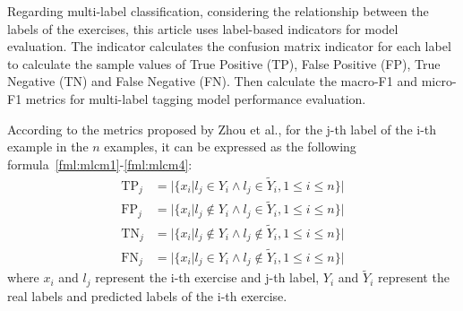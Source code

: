 
Regarding multi-label classification, considering the relationship between the labels of the exercises, this article uses label-based indicators for model evaluation. The indicator calculates the confusion matrix indicator for each label to calculate the sample values of True Positive (TP), False Positive (FP), True Negative (TN) and False Negative (FN). Then calculate the macro-F1 and micro-F1 metrics for multi-label tagging model performance evaluation.

According to the metrics proposed by Zhou et al.\cite{zhang2013review}, for the j-th label of the i-th example in the \(n\) examples, it can be expressed as the following formula~\ref{fml:mlcm1}-\ref{fml:mlcm4}:
\begin{align}
	\operatorname{TP}_j & =| \{x_i| l_j\in Y_{i}\wedge l_j \in \tilde{Y}_i , 1\leq i \leq n\}| \label{fml:mlcm1}       \\
	\operatorname{FP}_j & =| \{x_i| l_j\notin Y_{i}\wedge l_j \in \tilde{Y}_i , 1\leq i \leq n\}| \label{fml:mlcm2}    \\
	\operatorname{TN}_j & =| \{x_i| l_j\notin Y_{i}\wedge l_j \notin \tilde{Y}_i , 1\leq i \leq n\}| \label{fml:mlcm3} \\
	\operatorname{FN}_j & =| \{x_i| l_j\in Y_{i}\wedge l_j \notin \tilde{Y}_i , 1\leq i \leq n\}| \label{fml:mlcm4}
\end{align}
where \(x_i\) and \(l_j\) represent the i-th exercise and j-th label, \(Y_i\) and \(\tilde{Y}_i\) represent the real labels and predicted labels of the i-th exercise.


